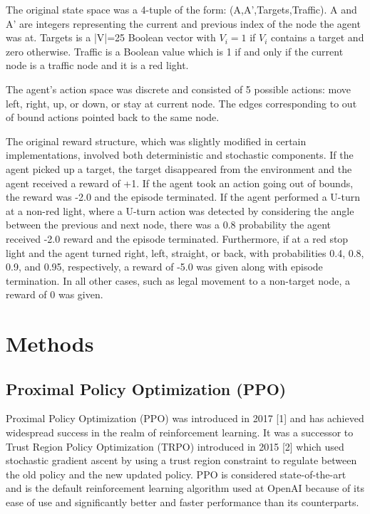 \documentclass{article}
\begin{document}
        The original state space was a 4-tuple of the form: (A,A',Targets,Traffic). A and A' are integers representing the current and previous index of the node the agent was at. Targets is a |V|=25 Boolean vector with $V_{i}=1$ if $V_i$ contains a target and zero otherwise. Traffic is a Boolean value which is 1 if and only if the current node is a traffic node and it is a red light.

        The agent's action space was discrete and consisted of 5 possible actions: move left, right, up, or down, or stay at current node. The edges corresponding to out of bound actions pointed back to the same node.

        The original reward structure, which was slightly modified in certain implementations, involved both deterministic and stochastic components. If the agent picked up a target, the target disappeared from the environment and the agent received a reward of +1. If the agent took an action going out of bounds, the reward was -2.0 and the episode terminated. If the agent performed a U-turn at a non-red light, where a U-turn action was detected by considering the angle between the previous and next node, there was a 0.8 probability the agent received -2.0 reward and the episode terminated. Furthermore, if at a red stop light and the agent turned right, left, straight, or back, with probabilities 0.4, 0.8, 0.9, and 0.95, respectively, a reward of -5.0 was given along with episode termination. In all other cases, such as legal movement to a non-target node, a reward of 0 was given.
        
    \section{Methods}
    \subsection{Proximal Policy Optimization (PPO)}
    \label{ppo}
    
    Proximal Policy Optimization (PPO) was introduced in 2017 [1] and has achieved widespread success in the realm of reinforcement learning. It was a successor to Trust Region Policy Optimization (TRPO) introduced in 2015 [2] which used stochastic gradient ascent by using a trust region constraint to regulate between the old policy and the new updated policy. PPO is considered state-of-the-art and is the default reinforcement learning algorithm used at OpenAI because of its ease of use and significantly better and faster performance than its counterparts. 
    
\end{document}
